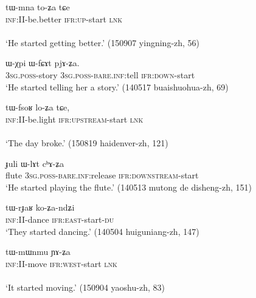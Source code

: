 \begin{exe} 
\ex \label{ex:tWmna.toZa}
\gll tɯ-mna to-ʑa tɕe \\
\textsc{inf}:II-be.better \textsc{ifr}:\textsc{up}-start \textsc{lnk} \\
\\
\glt `He started getting better.' (150907 yingning-zh, 56)
\end{exe} 

\begin{exe} 
\ex \label{ex:WfCAt.pjAZa}
\gll ɯ-χpi ɯ-fɕɤt pjɤ-ʑa. \\
\textsc{3sg}.\textsc{poss}-story \textsc{3sg}.\textsc{poss}-\textsc{bare}.\textsc{inf}:tell \textsc{ifr}:\textsc{down}-start \\
\glt `He started telling her a story.' (140517 buaishuohua-zh, 69)
\end{exe} 

\begin{exe} 
\ex \label{ex:tWfsoR.loZa}
\gll tɯ-fsoʁ lo-ʑa tɕe, \\
\textsc{inf}:II-be.light \textsc{ifr}:\textsc{upstream}-start \textsc{lnk} \\
\\
\glt `The day broke.' (150819 haidenver-zh, 121)
\end{exe} 

\begin{exe} 
\ex \label{ex:WlAt.chAZa}
\gll  ɟuli ɯ-lɤt cʰɤ-ʑa  \\
flute  \textsc{3sg}.\textsc{poss}-\textsc{bare}.\textsc{inf}:release \textsc{ifr}:\textsc{downstream}-start \\
\glt `He started playing the flute.' (140513 mutong de disheng-zh, 151)
\end{exe} 

\begin{exe} 
\ex \label{ex:tWrJaR.koZandZi}
\gll tɯ-rɟaʁ ko-ʑa-ndʑi \\
\textsc{inf}:II-dance \textsc{ifr}:\textsc{east}-start-\textsc{du} \\
\glt `They started dancing.' (140504 huiguniang-zh, 147)
\end{exe} 

\begin{exe} 
\ex \label{ex:tWmWnmu.YAZa}
\gll tɯ-mɯnmu ɲɤ-ʑa \\
\textsc{inf}:II-move \textsc{ifr}:\textsc{west}-start \textsc{lnk} \\
\\
\glt `It started moving.' (150904 yaoshu-zh, 83)
\end{exe} 

